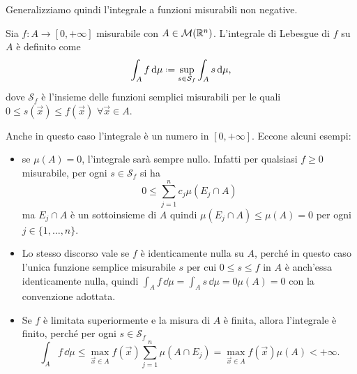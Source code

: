 Generalizziamo quindi l'integrale a funzioni misurabili non negative.
\begin{definizione} \label{d:integrale-lebesgue-funzioni-nonnegative}
	Sia $f\colon A\to[0,+\infty]$ misurabile con $A\in\mathcal M(\mathbb{R}^n)$.
	L'integrale di Lebesgue di $f$ su $A$ è definito come
	\begin{equation}
		\int_Af\,\dd\mu\defeq \sup_{s\in\mathcal S_f}\int_As\,\dd\mu,
		\label{eq:integrale-lebesgue-funzioni-nonnegative}
	\end{equation}
	dove $\mathcal S_f$ è l'insieme delle funzioni semplici misurabili per le quali $0\leq s(\vec x)\leq f(\vec x)$ $\forall\vec x\in A$.
\end{definizione}
Anche in questo caso l'integrale è un numero in $[0,+\infty]$.
Eccone alcuni esempi:
\begin{itemize}
	\item se $\mu(A)=0$, l'integrale sarà sempre nullo.
		Infatti per qualsiasi $f\geq 0$ misurabile, per ogni $s\in\mathcal S_f$ si ha
		\begin{equation}
			0\leq \sum_{j=1}^nc_j\mu(E_j\cap A)
		\end{equation}
		ma $E_j\cap A$ è un sottoinsieme di $A$ quindi $\mu(E_j\cap A)\leq\mu(A)=0$ per ogni $j\in\{1,\dots,n\}$.
	\item Lo stesso discorso vale se $f$ è identicamente nulla su $A$, perch\'e in questo caso l'unica funzione semplice misurabile $s$ per cui $0\leq s\leq f$ in $A$ è anch'essa identicamente nulla, quindi $\int_Af\,\dd\mu=\int_As\,\dd\mu=0\mu(A)=0$ con la convenzione adottata.
	\item Se $f$ è limitata superiormente e la misura di $A$ è finita, allora l'integrale è finito, perch\'e per ogni $s\in\mathcal S_f$
		\begin{equation}
			\int_Af\,\dd\mu\leq\max_{\vec x\in A}f(\vec x)\sum_{j=1}^n\mu(A\cap E_j)=\max_{\vec x\in A}f(\vec x)\mu(A)<+\infty.
		\end{equation}
\end{itemize}

